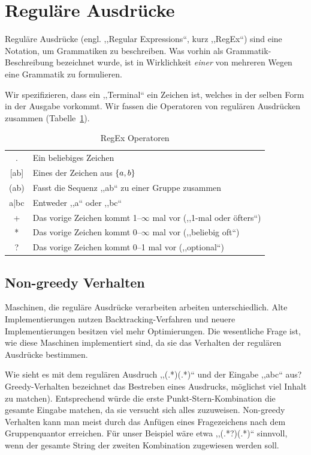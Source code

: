\section{Reguläre Ausdrücke}
%
Reguläre Ausdrücke (engl. ,,Regular Expressions``, kurz ,,RegEx``) sind eine Notation, um Grammatiken zu beschreiben. Was vorhin als Grammatik-Beschreibung bezeichnet wurde, ist in Wirklichkeit \emph{einer} von mehreren Wegen eine Grammatik zu formulieren. 

Wir spezifizieren, dass ein ,,Terminal`` ein Zeichen ist, welches in der selben Form in der Ausgabe vorkommt. Wir fassen die Operatoren von regulären Ausdrücken zusammen (Tabelle~\ref{tab:regex_op}).

\begin{table}[ht]
 \begin{center}
  \begin{tabular}{cl}
   \hline
    .     & Ein beliebiges Zeichen \\
 {[}ab{]} & Eines der Zeichen aus $\left\{a, b\right\}$ \\
    (ab)  & Fasst die Sequenz ,,ab`` zu einer Gruppe zusammen \\
    a|bc  & Entweder ,,a`` oder ,,bc`` \\
    +     & Das vorige Zeichen kommt 1--$\infty$ mal vor (,,1-mal oder öfters``) \\
    *     & Das vorige Zeichen kommt 0--$\infty$ mal vor (,,beliebig oft``) \\
    ?     & Das vorige Zeichen kommt 0--1 mal vor (,,optional``) \\
   \hline
  \end{tabular}
  \caption{RegEx Operatoren}
  \label{tab:regex_op}
 \end{center}
\end{table}

\subsection{Non-greedy Verhalten}
%
Maschinen, die reguläre Ausdrücke verarbeiten arbeiten unterschiedlich. Alte Implementierungen nutzen Backtracking-Verfahren und neuere Implementierungen besitzen viel mehr Optimierungen. Die wesentliche Frage ist, wie diese Maschinen implementiert sind, da sie das Verhalten der regulären Ausdrücke bestimmen.

Wie sieht es mit dem regulären Ausdruch ,,(.*)(.*)`` und der Eingabe ,,abc`` aus? Greedy-Verhalten bezeichnet das Bestreben eines Ausdrucks, möglichst viel Inhalt zu matchen). Entsprechend würde die erste Punkt-Stern-Kombination die gesamte Eingabe matchen, da sie versucht sich alles zuzuweisen. Non-greedy Verhalten kann man meist durch das Anfügen eines Fragezeichens nach dem Gruppenquantor erreichen. Für unser Beispiel wäre etwa ,,(.*?)(.*)`` sinnvoll, wenn der gesamte String der zweiten Kombination zugewiesen werden soll.

